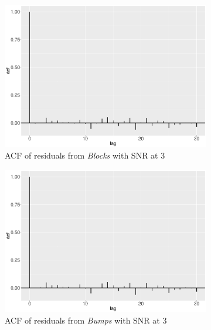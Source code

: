 \begin{figure}[!ht]
    \centering
    \begin{subfigure}{0.45\textwidth}
    \centering
    \includegraphics[width=\textwidth]{Chapters/02TractorSplineTheory/plot/ggplot/ggacfBlocks3.pdf}
    \caption{ACF of residuals from \textit{Blocks} with SNR at 3 }
    \end{subfigure}%
    \begin{subfigure}{0.45\textwidth}
    \centering
    \includegraphics[width=\textwidth]{Chapters/02TractorSplineTheory/plot/ggplot/ggacfBumps3.pdf}
    \caption{ACF of residuals from \textit{Bumps} with SNR at 3 }
    \end{subfigure}
    \begin{subfigure}{0.45\textwidth}
    \centering

\end{subfigure}
\end{figure}
